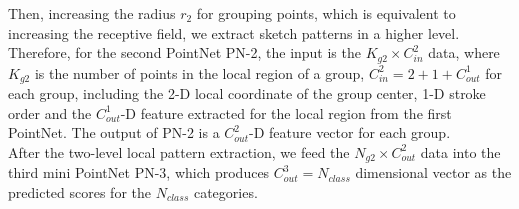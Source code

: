 Then, increasing the radius $r_2$ for grouping points, which is equivalent to increasing the receptive field, we extract sketch patterns in a higher level.
%
Therefore, for the second PointNet PN-2, the input is the $K_{g2} \times C^2_{in}$ data, where $K_{g2}$ is the number of points in the local region of a group, $C^2_{in}=2+1+C^1_{out}$ for each group, including the 2-D local coordinate of the group center, 1-D stroke order and the $C^1_{out}$-D feature extracted for the local region from the first PointNet.
%
The output of PN-2 is a $C^2_{out}$-D feature vector for each group.
\\

After the two-level local pattern extraction, we feed the $N_{g2} \times C^2_{out}$ data into the third mini PointNet PN-3, which produces $C^{3}_{out}=N_{class}$ dimensional vector as the predicted scores for the $N_{class}$ categories. 





